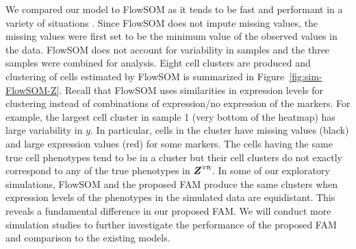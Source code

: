 \documentclass[12pt,]{article}
\newcommand{\true}{{\mbox{\tiny TR}}}
\newcommand{\bZ}{\mbox{\boldmath $Z$}}
\begin{document}
We compared our model to FlowSOM as it tends to be fast and performant in a
variety of situations \citep{weber2016comparison}. Since FlowSOM does not
impute missing values, the missing values were first set to be the minimum
value of the observed values in the data. FlowSOM does not account for variability in samples and the three samples were combined for analysis.  Eight
cell clusters are produced and clustering of cells estimated by FlowSOM is
%
summarized in Figure~\ref{fig:sim-FlowSOM-Z}. Recall that FlowSOM uses
similarities in expression levels for clustering instead of combinations of
expression/no expression of the markers. For example, the largest cell cluster
in sample 1 (very bottom of the heatmap) has large variability in $y$. In
particular, cells in the cluster have missing values (black) and large
expression values (red) for some markers.   The cells having the same true cell
phenotypes tend to be in a cluster but their cell clusters do not exactly
correspond to any of the true phenotypes in $\bZ^\true$.
%
In some of our exploratory simulations, FlowSOM and the proposed FAM produce
the same clusters when expression levels of the phenotypes in the simulated
data are equidistant.  This reveals a fundamental difference in our proposed
FAM. We will conduct more simulation studies to further investigate the
performance of the proposed FAM and comparison to the existing models.


\end{document}
